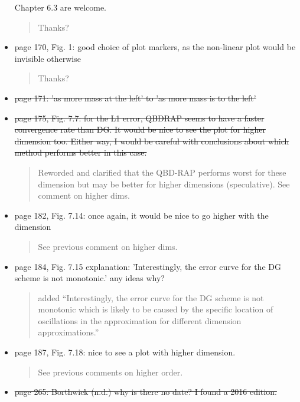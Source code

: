 \documentclass[a4paper]{article}
\begin{document}
\begin{itemize}
Chapter 6.3 are welcome.
\begin{quote}
    Thanks?
\end{quote}
\item page 170, Fig. 1: good choice of plot markers, as the non-linear plot would be
invisible otherwise
\begin{quote}
    Thanks?
\end{quote}
\item \st{page 171: 'as more mass at the left' to 'as more mass is to the left'}
\item \st{page 175, Fig. 7.7: for the L1 error, QBDRAP seems to have a faster convergence
rate than DG. It would be nice to see the plot for higher dimension too. Either
way, I would be careful with conclusions about which method performs better in
this case.}
\begin{quote}
    Reworded and clarified that the QBD-RAP performs worst for these dimension but may be better for higher dimensions (speculative). See comment on higher dims.
\end{quote}
\item page 182, Fig. 7.14: once again, it would be nice to go higher with the dimension
\begin{quote}
    See previous comment on higher dims.
\end{quote}
\item page 184, Fig. 7.15 explanation: 'Interestingly, the error curve for the DG scheme
is not monotonic.' any ideas why?
\begin{quote}
    added ``Interestingly, the error curve for the DG scheme
    is not monotonic which is likely to be caused by the specific location of oscillations in the approximation for different dimension approximations.''
\end{quote}
\item page 187, Fig. 7.18: nice to see a plot with higher dimension.
\begin{quote}
    See previous comments on higher order.
\end{quote}
\item \st{page 265: Borthwick (n.d.) why is there no date? I found a 2016 edition.}
\end{itemize}
\end{document}

